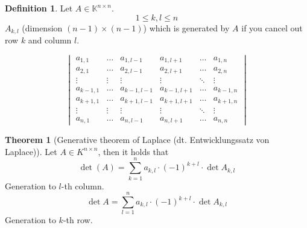 \documentclass[a4paper,landscape,twocolumn]{article}
\theoremstyle{definition}
\newtheorem{theorem}{Theorem}
\newtheorem{defi}{Definition}
\begin{document}
\begin{defi}
  \label{definition-7.36}
  Let $A \in \mathbb K^{n\times n}$.
  \[ 1 \leq k, l \leq n \]
  $A_{k,l}$ (dimension $(n-1) \times (n-1)$) which is generated by $A$ if you cancel out row $k$ and column $l$.

  \[
    \begin{vmatrix}
      a_{1,1} & \ldots & a_{1,l-1} & a_{1,l+1} & \ldots & a_{1,n} \\
      a_{2,1} & \ldots & a_{2,l-1} & a_{2,l+1} & \ldots & a_{2,n} \\
      \vdots & \vdots & \vdots    & \vdots    & \ddots & \vdots \\
      a_{k-1,1} & \ldots & a_{k-1,l-1} & a_{k-1,l+1} & \ldots & a_{k-1,n} \\
      a_{k+1,1} & \ldots & a_{k+1,l-1} & a_{k+1,l+1} & \ldots & a_{k+1,n} \\
      \vdots & \vdots & \vdots    & \vdots    & \ddots & \vdots \\
      a_{n,1} & \ldots & a_{n,l-1} & a_{n,l+1} & \ldots & a_{n,n}
    \end{vmatrix}
  \]
\end{defi}

\begin{theorem}[Generative theorem of Laplace (dt. Entwicklungssatz von Laplace)]
  \label{thm:laplace-entwicklung}
  Let $A \in K^{n\times n}$, then it holds that
  \[ \det(A) = \sum_{k=1}^n a_{k,l} \cdot (-1)^{k+l} \cdot \det{A_{k,l}} \]
  Generation to $l$-th column.
  \[ \det{A} = \sum_{l=1}^n a_{k,l} \cdot (-1)^{k+l} \cdot \det{A_{k,l}} \]
  Generation to $k$-th row.
\end{theorem}
\end{document}
